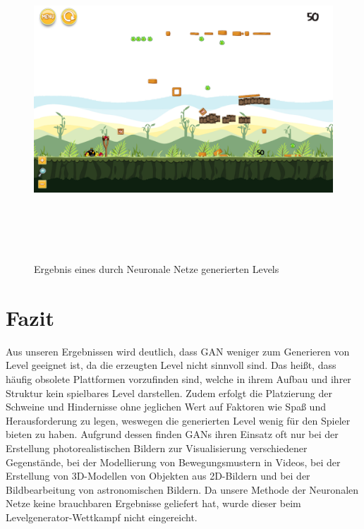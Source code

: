 \begin{figure}
	\centering
	\includegraphics[height=12cm, width=17cm]{img/sample_level.png}
	\caption{Ergebnis eines durch Neuronale Netze generierten Levels}
\end{figure}
\section{Fazit}
Aus unseren Ergebnissen wird deutlich, dass GAN weniger zum Generieren von Level geeignet ist, da die erzeugten Level nicht sinnvoll sind. Das heißt, dass häufig obsolete Plattformen vorzufinden sind, welche in ihrem Aufbau und ihrer Struktur kein spielbares Level darstellen. Zudem erfolgt die Platzierung der Schweine und Hindernisse ohne jeglichen Wert auf Faktoren wie Spaß und Herausforderung zu legen, weswegen die generierten Level wenig für den Spieler bieten zu haben. Aufgrund dessen finden GANs ihren Einsatz oft nur bei der Erstellung photorealistischen Bildern zur Visualisierung verschiedener Gegenstände, bei der Modellierung von Bewegungsmustern in Videos, bei der Erstellung von 3D-Modellen von Objekten aus 2D-Bildern und bei der  Bildbearbeitung von astronomischen Bildern. Da unsere Methode der Neuronalen Netze keine brauchbaren Ergebnisse geliefert hat, wurde dieser beim Levelgenerator-Wettkampf nicht eingereicht. 
